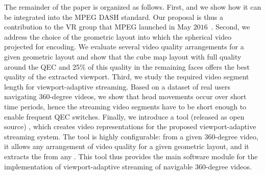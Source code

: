 The remainder of the paper is organized as follows. First,  and
we show how it can be integrated into
the \ac{MPEG} \ac{DASH} standard. Our proposal is thus a contribution
to the \ac{VR} group that \ac{MPEG} launched in May
$2016$~\cite{mpeg-vr}. Second, we address the choice of the geometric
layout into which the spherical video  projected for
encoding. We evaluate several video quality arrangements for a given
geometric layout and show that the cube map layout with full quality around the QEC and 25\% of this quality in the remaining faces offers the best quality of the extracted viewport.
Third, we study the required video segment length for
viewport-adaptive streaming. Based on a dataset of real users
navigating 360-degree videos, we show that head movements occur over
short time periods, hence the streaming video segments have to be
short enough to enable frequent \ac{QEC} switches. 
Finally, we introduce a tool (released as open source)%
, which creates video representations for the proposed viewport-adaptive streaming system.
The tool is highly configurable: from a given
360-degree video, it allows any arrangement of video quality for a
given geometric layout, and it extracts the  from any .
This tool thus provides the main software module
for the implementation of viewport-adaptive streaming of navigable
360-degree videos.

